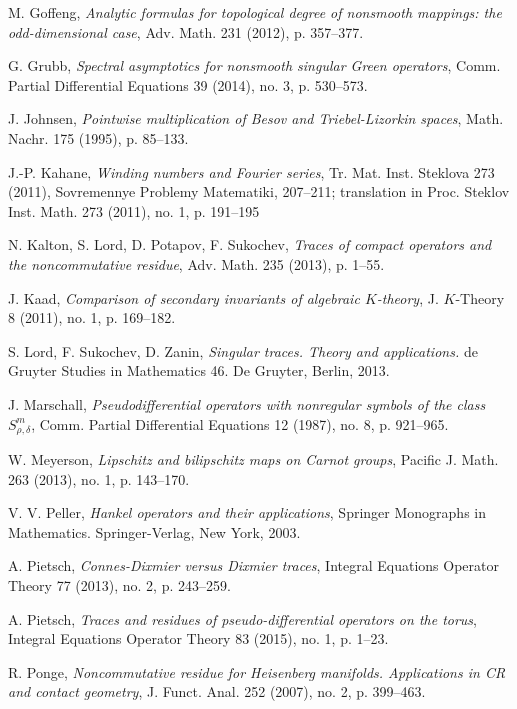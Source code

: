 \documentclass[10pt]{amsart}
\theoremstyle{remark}
\theoremstyle{definition}
\begin{document}
\begin{thebibliography}{100}
 M. Goffeng, \emph{Analytic formulas for topological degree of nonsmooth mappings: the odd-dimensional case}, Adv. Math. 231 (2012), p. 357--377.

 G. Grubb, \emph{Spectral asymptotics for nonsmooth singular Green operators}, Comm. Partial Differential Equations 39 (2014), no. 3, p. 530--573. 

 J. Johnsen, \emph{Pointwise multiplication of Besov and Triebel-Lizorkin spaces}, Math. Nachr. 175 (1995), p. 85--133.

 J.-P. Kahane, \emph{Winding numbers and Fourier series}, Tr. Mat. Inst. Steklova 273 (2011), Sovremennye Problemy Matematiki, 207--211; translation in Proc. Steklov Inst. Math. 273 (2011), no. 1, p. 191--195

 N. Kalton, S. Lord, D. Potapov, F. Sukochev, \emph{Traces of compact operators and the noncommutative residue}, Adv. Math. 235 (2013), p. 1--55.

 J. Kaad, \emph{Comparison of secondary invariants of algebraic $K$-theory}, J. $K$-Theory 8 (2011), no. 1, p. 169--182.

 S. Lord, F. Sukochev, D. Zanin, \emph{Singular traces. Theory and applications.} de Gruyter Studies in Mathematics 46. De Gruyter, Berlin, 2013.

 J. Marschall, \emph{Pseudodifferential operators with nonregular symbols of the class $S^m_{\rho,\delta}$}, Comm. Partial Differential Equations 12 (1987), no. 8, p. 921--965.

 W. Meyerson, \emph{Lipschitz and bilipschitz maps on Carnot groups}, Pacific J. Math. 263 (2013), no. 1, p. 143--170.

 V. V. Peller, \emph{Hankel operators and their applications}, Springer Monographs in Mathematics. Springer-Verlag, New York, 2003. 

 A. Pietsch, \emph{Connes-Dixmier versus Dixmier traces}, Integral Equations Operator Theory 77 (2013), no. 2, p. 243--259.

 A. Pietsch, \emph{Traces and residues of pseudo-differential operators on the torus}, Integral Equations Operator Theory 83 (2015), no. 1, p. 1--23.

 R. Ponge, \emph{Noncommutative residue for Heisenberg manifolds. Applications in CR and contact geometry}, J. Funct. Anal. 252 (2007), no. 2, p. 399--463.


\end{thebibliography}
\end{document}
